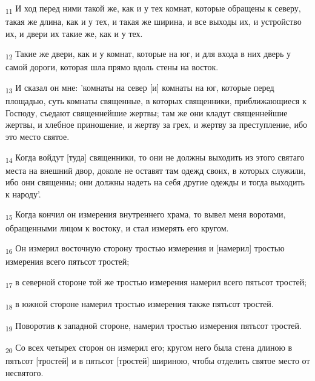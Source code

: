 \begin{tcolorbox}
\textsubscript{11} И ход перед ними такой же, как и у тех комнат, которые обращены к северу, такая же длина, как и у тех, и такая же ширина, и все выходы их, и устройство их, и двери их такие же, как и у тех.
\end{tcolorbox}
\begin{tcolorbox}
\textsubscript{12} Такие же двери, как и у комнат, которые на юг, и для входа в них дверь у самой дороги, которая шла прямо вдоль стены на восток.
\end{tcolorbox}
\begin{tcolorbox}
\textsubscript{13} И сказал он мне: 'комнаты на север [и] комнаты на юг, которые перед площадью, суть комнаты священные, в которых священники, приближающиеся к Господу, съедают священнейшие жертвы; там же они кладут священнейшие жертвы, и хлебное приношение, и жертву за грех, и жертву за преступление, ибо это место святое.
\end{tcolorbox}
\begin{tcolorbox}
\textsubscript{14} Когда войдут [туда] священники, то они не должны выходить из этого святаго места на внешний двор, доколе не оставят там одежд своих, в которых служили, ибо они священны; они должны надеть на себя другие одежды и тогда выходить к народу'.
\end{tcolorbox}
\begin{tcolorbox}
\textsubscript{15} Когда кончил он измерения внутреннего храма, то вывел меня воротами, обращенными лицом к востоку, и стал измерять его кругом.
\end{tcolorbox}
\begin{tcolorbox}
\textsubscript{16} Он измерил восточную сторону тростью измерения и [намерил] тростью измерения всего пятьсот тростей;
\end{tcolorbox}
\begin{tcolorbox}
\textsubscript{17} в северной стороне той же тростью измерения намерил всего пятьсот тростей;
\end{tcolorbox}
\begin{tcolorbox}
\textsubscript{18} в южной стороне намерил тростью измерения также пятьсот тростей.
\end{tcolorbox}
\begin{tcolorbox}
\textsubscript{19} Поворотив к западной стороне, намерил тростью измерения пятьсот тростей.
\end{tcolorbox}
\begin{tcolorbox}
\textsubscript{20} Со всех четырех сторон он измерил его; кругом него была стена длиною в пятьсот [тростей] и в пятьсот [тростей] шириною, чтобы отделить святое место от несвятого.
\end{tcolorbox}
